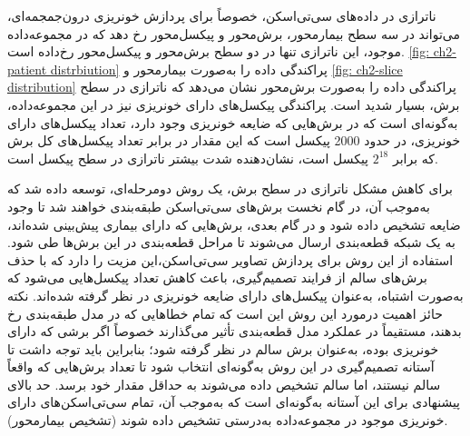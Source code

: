 ناترازی در داده‌های سی‌تی‌اسکن، خصوصاً برای پردازش خونریزی درون‌جمجمه‌ای، می‌تواند در سه سطح بیمار‌محور، برش‌محور و پیکسل‌محور رخ دهد که در مجموعه‌داده موجود،‌ این ناترازی تنها در دو سطح برش‌محور و پیکسل‌محور رخ‌داده است. 
\autoref{fig: ch2-patient distrbiution}
پراکندگی داده را به‌صورت بیمارمحور و 
\autoref{fig: ch2-slice distribution}
پراکندگی داده را به‌صورت برش‌محور نشان می‌دهد که ناترازی در سطح برش، بسیار شدید است. 
پراکندگی پیکسل‌های دارای خونریزی نیز در این مجموعه‌داده، به‌گونه‌ای است که در برش‌هایی که ضایعه خونریزی وجود دارد، تعداد پیکسل‌های دارای خونریزی، در حدود 2000 پیکسل است که این مقدار در برابر تعداد پیکسل‌های کل برش که برابر 
$2^{18}$
پیکسل است،‌ نشان‌دهنده شدت بیشتر ناترازی در سطح پیکسل است.

برای کاهش مشکل ناترازی در سطح برش، یک روش دومرحله‌ای، توسعه داده‌ شد که به‌موجب آن،‌ در گام نخست برش‌های سی‌تی‌اسکن طبقه‌بندی خواهند شد تا وجود ضایعه تشخیص داده ‌شود و در گام بعدی،‌ برش‌هایی که دارای بیماری پیش‌بینی شده‌اند،‌ به یک شبکه قطعه‌بندی ارسال می‌شوند تا مراحل قطعه‌بندی در این برش‌ها طی شود.
استفاده از این روش برای پردازش تصاویر سی‌تی‌اسکن،‌این مزیت را دارد که با حذف برش‌های سالم از فرایند تصمیم‌گیری، باعث کاهش تعداد پیکسل‌هایی می‌شود که به‌صورت اشتباه،‌ به‌عنوان پیکسل‌های دارای ضایعه خونریزی در نظر گرفته شده‌اند. نکته حائز اهمیت درمورد این روش این است که تمام خطاهایی که در مدل طبقه‌بندی رخ بدهند، مستقیماً  در عملکرد مدل قطعه‌بندی تأثیر  می‌گذارند خصوصاً  اگر برشی که دارای خونریزی بوده، به‌عنوان برش سالم در نظر گرفته شود؛ بنابراین باید توجه داشت تا آستانه تصمیم‌گیری در این روش به‌گونه‌ای انتخاب شود تا تعداد برش‌هایی که واقعاً سالم نیستند، اما سالم تشخیص‌ داده می‌شوند به حداقل مقدار خود برسد. حد بالای پیشنهادی برای این آستانه به‌گونه‌ای است که به‌موجب آن، تمام سی‌تی‌اسکن‌های دارای خونریزی  موجود در مجموعه‌داده به‌درستی تشخیص داده ‌شوند (تشخیص بیمار‌محور). 


